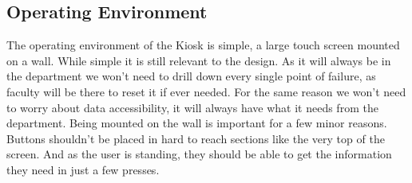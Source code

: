  

\subsection{Operating Environment}
 The operating environment of the Kiosk is simple, a large touch screen mounted on a wall. While simple it is still relevant to the design. As it will always be in the department we won’t need to drill down every single point of failure, as faculty will be there to reset it if ever needed. For the same reason we won’t need to worry about data accessibility, it will always have what it needs from the department. Being mounted on the wall is important for a few minor reasons. Buttons shouldn’t be placed in hard to reach sections like the very top of the screen. And as the user is standing, they should be able to get the information they need in just a few presses.
